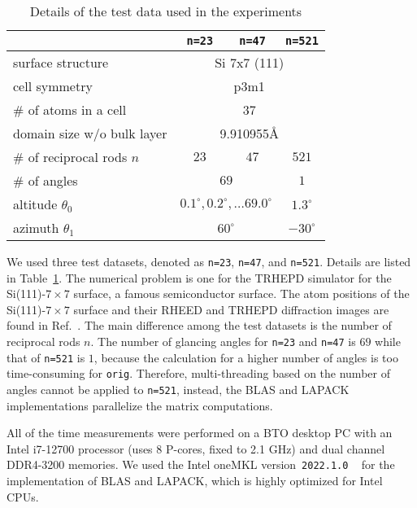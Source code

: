 \documentclass[preprint, 5p, times, sort&compress]{elsarticle}
\begin{document}
        \begin{table}
                \centering
                \caption{Details of the test data used in the experiments}\label{tab:testdata}
                \begin{tabular}{lccc}
                        \toprule
                        & \texttt{n=23} & \texttt{n=47} & \texttt{n=521} \\
                        \midrule
                        surface structure & \multicolumn{3}{c}{Si 7x7 (111)} \\
                        cell symmetry & \multicolumn{3}{c}{p3m1} \\
                        \# of atoms in a cell & \multicolumn{3}{c}{37} \\
                        domain size w/o bulk layer& \multicolumn{3}{c}{9.910955\si{\angstrom}}\\
                        \# of reciprocal rods $n$ & $23$ & $47$ & $521$ \\
                        \# of angles & \multicolumn{2}{c}{$69$} & $1$ \\
                        altitude $\theta_0$ & \multicolumn{2}{c}{$0.1^{\circ}, 0.2^{\circ}, \ldots 69.0^{\circ}$}& $1.3^{\circ}$ \\
                        azimuth $\theta_1$ & \multicolumn{2}{c}{$60^{\circ}$} & $-30^{\circ}$ \\
                        \bottomrule
                \end{tabular}
        \end{table}
        We used three test datasets, denoted as \texttt{n=23}, \texttt{n=47}, and \texttt{n=521}.
        Details are listed in Table~\ref{tab:testdata}.
        The numerical problem is one for the TRHEPD simulator for the Si(111)-$7 \times 7$ surface, a famous semiconductor surface. The atom positions of the Si(111)-$7 \times 7$ surface and their RHEED and TRHEPD diffraction images are found in Ref.~\cite{Fukaya2019a}. 
        The main difference among the test datasets is the number of reciprocal rods $n$.
        The number of glancing angles for \texttt{n=23} and \texttt{n=47} is  $69$ while that of \texttt{n=521} is $1$,
        because the calculation for a higher number of angles is too time-consuming for \texttt{orig}.
        Therefore, multi-threading based on the number of angles cannot be applied to \texttt{n=521},
        instead, the BLAS and LAPACK implementations parallelize the matrix computations.


        All of the time measurements were performed on a BTO desktop PC with an Intel i7-12700 processor (uses 8 P-cores, fixed to 2.1 GHz) and dual channel DDR4-3200 memories.
        We used the Intel oneMKL version~\texttt{2022.1.0} ~\cite{intelmkl2023} for the implementation of BLAS and LAPACK,
        which is highly optimized for Intel CPUs.
\end{document}
